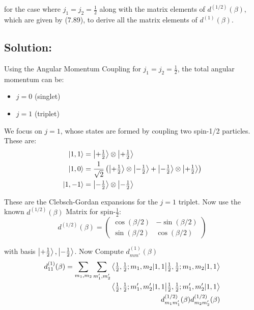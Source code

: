 \documentclass[12pt]{article}
\begin{document}
    for the case where \( j_1 = j_2 = \frac{1}{2} \) along with the matrix elements of \( d^{(1/2)}(\beta) \), which are given by (7.89), to derive all the matrix elements of \( d^{(1)}(\beta) \).

    \subsection{Solution:}
        Using the Angular Momentum Coupling for \( j_1 = j_2 = \frac{1}{2} \), the total angular momentum can be:
        \begin{itemize}
            \item \( j = 0 \) (singlet)
            \item \( j = 1 \) (triplet)
        \end{itemize}

        We focus on \( j = 1 \), whose states are formed by coupling two spin-1/2 particles. These are:
        \[
            \begin{aligned}
                \ket{1, 1} &= \ket{+\tfrac{1}{2}} \otimes \ket{+\tfrac{1}{2}} \\
                \ket{1, 0} &= \frac{1}{\sqrt{2}} \left( \ket{+\tfrac{1}{2}} \otimes \ket{-\tfrac{1}{2}} + \ket{-\tfrac{1}{2}} \otimes \ket{+\tfrac{1}{2}} \right) \\
                \ket{1, -1} &= \ket{-\tfrac{1}{2}} \otimes \ket{-\tfrac{1}{2}} \\
            \end{aligned}
        \]

        These are the Clebsch-Gordan expansions for the \( j = 1 \) triplet. Now use the known \( d^{(1/2)}(\beta) \) Matrix for spin-\( \frac{1}{2} \):
        \[
            d^{(1/2)}(\beta) = 
            \begin{pmatrix}
                \cos(\beta/2) & -\sin(\beta/2) \\
                \sin(\beta/2) & \cos(\beta/2)
            \end{pmatrix}
        \]

        with basis \( \ket{+\tfrac{1}{2}}, \ket{-\tfrac{1}{2}} \). Now Compute \( d^{(1)}_{mm'}(\beta) \)
        \begin{equation}
            \begin{split}
                d^{(1)}_{11}(\beta) = \sum_{m_1, m_2} \sum_{m_1', m_2'} 
                \braket{\tfrac{1}{2}, \tfrac{1}{2}; m_1, m_2 | 1, 1} \\
                \braket{\tfrac{1}{2}, \tfrac{1}{2}; m_1', m_2' | 1, 1} \\
                d^{(1/2)}_{m_1 m_1'}(\beta) d^{(1/2)}_{m_2 m_2'}(\beta)
            \end{split}
        \end{equation}
\end{document}
